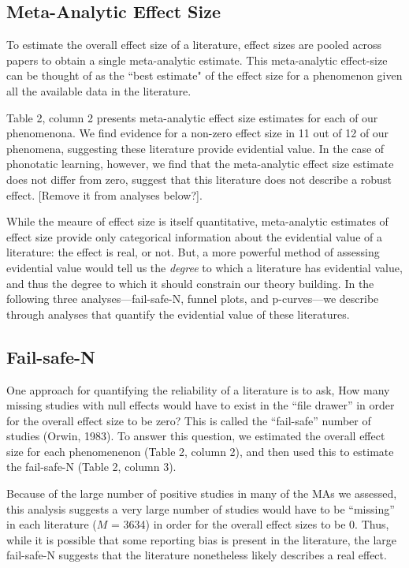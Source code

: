\documentclass[english,floatsintext,man]{apa6}
\begin{document}
\subsection{Meta-Analytic Effect Size}\label{meta-analytic-effect-size}

To estimate the overall effect size of a literature, effect sizes are
pooled across papers to obtain a single meta-analytic estimate. This
meta-analytic effect-size can be thought of as the ``best estimate" of
the effect size for a phenomenon given all the available data in the
literature.

Table 2, column 2 presents meta-analytic effect size estimates for each
of our phenomenona. We find evidence for a non-zero effect size in 11
out of 12 of our phenomena, suggesting these literature provide
evidential value. In the case of phonotatic learning, however, we find
that the meta-analytic effect size estimate does not differ from zero,
suggest that this literature does not describe a robust effect.
{[}Remove it from analyses below?{]}.

While the meaure of effect size is itself quantitative, meta-analytic
estimates of effect size provide only categorical information about the
evidential value of a literature: the effect is real, or not. But, a
more powerful method of assessing evidential value would tell us the
\emph{degree} to which a literature has evidential value, and thus the
degree to which it should constrain our theory building. In the
following three analyses---fail-safe-N, funnel plots, and p-curves---we
describe through analyses that quantify the evidential value of these
literatures.

\subsection{Fail-safe-N}\label{fail-safe-n}

One approach for quantifying the reliability of a literature is to ask,
How many missing studies with null effects would have to exist in the
\enquote{file drawer} in order for the overall effect size to be zero?
This is called the \enquote{fail-safe} number of studies (Orwin, 1983).
To answer this question, we estimated the overall effect size for each
phenomenenon (Table 2, column 2), and then used this to estimate the
fail-safe-N (Table 2, column 3).

Because of the large number of positive studies in many of the MAs we
assessed, this analysis suggests a very large number of studies would
have to be \enquote{missing} in each literature (\(M\) = 3634) in order
for the overall effect sizes to be 0. Thus, while it is possible that
some reporting bias is present in the literature, the large fail-safe-N
suggests that the literature nonetheless likely describes a real effect.
\end{document}
